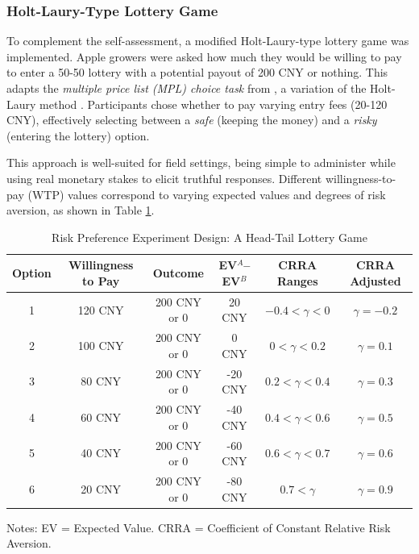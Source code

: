 \subsubsection{Holt-Laury-Type Lottery Game}  
\noindent To complement the self-assessment, a modified Holt-Laury-type lottery game was implemented. Apple growers were asked how much they would be willing to pay to enter a 50-50 lottery with a potential payout of 200 CNY or nothing. This adapts the \textit{multiple price list (MPL) choice task} from \cite{brick2012risk}, a variation of the Holt-Laury method \citep{holt2002risk}. Participants chose whether to pay varying entry fees (20-120 CNY), effectively selecting between a \textit{safe} (keeping the money) and a \textit{risky} (entering the lottery) option.  

This approach is well-suited for field settings, being simple to administer while using real monetary stakes to elicit truthful responses. Different willingness-to-pay (WTP) values correspond to varying expected values and degrees of risk aversion, as shown in Table \ref{tab:experiment_design}.  

\begin{table}[H]
    \centering
    \footnotesize 
    \caption{Risk Preference Experiment Design: A Head-Tail Lottery Game}
    \renewcommand{\arraystretch}{1.2}
    \begin{tabular}{cccccc}
        \toprule
        \textbf{Option} & \textbf{Willingness to Pay} & \textbf{Outcome} & \textbf{EV$^{A}$--EV$^{B}$} & \textbf{CRRA Ranges} & \textbf{CRRA Adjusted}\\
        \midrule
        1 & 120 CNY & 200 CNY or 0 & 20 CNY & $-0.4 < \gamma < 0$  & $\gamma = -0.2$\\
        2 & 100 CNY & 200 CNY or 0 & 0 CNY & $0 < \gamma < 0.2$  & $\gamma= 0.1$ \\
        3 & 80 CNY & 200 CNY or 0 & -20 CNY & $0.2 < \gamma < 0.4$  & $\gamma= 0.3$ \\
        4 & 60 CNY & 200 CNY or 0 & -40 CNY & $0.4 < \gamma < 0.6$  & $\gamma= 0.5$ \\
        5 & 40 CNY & 200 CNY or 0 & -60 CNY & $0.6 < \gamma < 0.7$  & $\gamma=0.6$ \\
        6 & 20 CNY & 200 CNY or 0 & -80 CNY & $0.7 < \gamma$  & $\gamma= 0.9$ \\
        \bottomrule
    \end{tabular}
    \label{tab:experiment_design}
    \vspace{0.5em}
    \small Notes: EV = Expected Value. CRRA = Coefficient of Constant Relative Risk Aversion.
\end{table}

